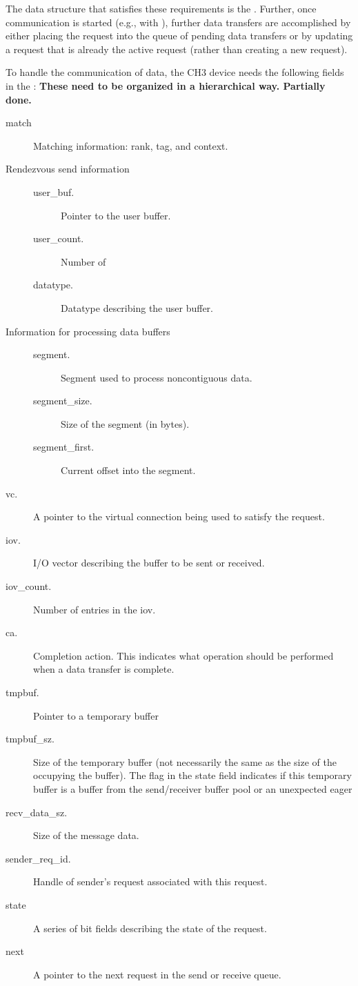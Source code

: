 \documentclass{article}
\begin{document}
The data structure that satisfies these requirements is the
.  Further, once communication is started (e.g., with
), further data transfers are accomplished by either placing
the request into the queue of pending data transfers or by updating a request
that is already the active request (rather than creating a new request).

To handle the communication of data, the CH3 device needs the following fields
in the :
\textbf{These need to be organized in a hierarchical way.  Partially done.}
\begin{description}
\item[match]Matching information: rank, tag, and context.
\item[Rendezvous send information]
  \begin{description}
  \item[user\_buf.]Pointer to the user buffer.
  \item[user\_count.]Number of 
  \item[datatype.]Datatype describing the user buffer.
  \end{description}
\item[Information for processing data buffers]
  \begin{description}
  \item[segment.]Segment used to process noncontiguous data.
  \item[segment\_size.]Size of the segment (in bytes).
  \item[segment\_first.]Current offset into the segment.
  \end{description}
\item[vc.]A pointer to the virtual connection being used to satisfy
the request.
\item[iov.]I/O vector describing the buffer to be sent or received.
\item[iov\_count.]Number of entries in the iov.
\item[ca.]Completion action.  This indicates what operation should be
performed when a data transfer is complete.
\item[tmpbuf.]Pointer to a temporary buffer
\item[tmpbuf\_sz.]Size of the temporary buffer (not necessarily the
same as the size of the occupying the buffer).  The  flag in the
state field indicates if this temporary buffer is a buffer from the
send/receiver buffer pool or an unexpected eager
\item[recv\_data\_sz.]Size of the message data.
\item[sender\_req\_id.]Handle of sender's request associated with this request.
\item[state]A series of bit fields describing the state of the request.
\item[next]A pointer to the next request in the send or receive queue.
\end{description}
\end{document}
